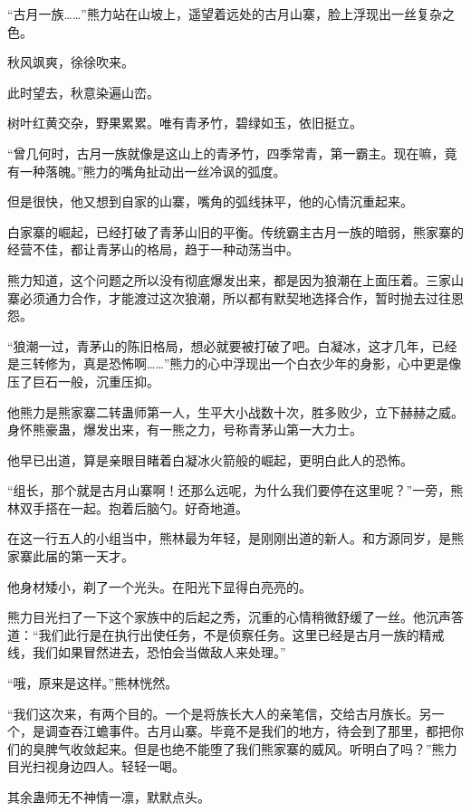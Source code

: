 
\begin{this_body}

“古月一族……”熊力站在山坡上，遥望着远处的古月山寨，脸上浮现出一丝复杂之色。

秋风飒爽，徐徐吹来。

此时望去，秋意染遍山峦。

树叶红黄交杂，野果累累。唯有青矛竹，碧绿如玉，依旧挺立。

“曾几何时，古月一族就像是这山上的青矛竹，四季常青，第一霸主。现在嘛，竟有一种落魄。”熊力的嘴角扯动出一丝冷讽的弧度。

但是很快，他又想到自家的山寨，嘴角的弧线抹平，他的心情沉重起来。

白家寨的崛起，已经打破了青茅山旧的平衡。传统霸主古月一族的暗弱，熊家寨的经营不佳，都让青茅山的格局，趋于一种动荡当中。

熊力知道，这个问题之所以没有彻底爆发出来，都是因为狼潮在上面压着。三家山寨必须通力合作，才能渡过这次狼潮，所以都有默契地选择合作，暂时抛去过往恩怨。

“狼潮一过，青茅山的陈旧格局，想必就要被打破了吧。白凝冰，这才几年，已经是三转修为，真是恐怖啊……”熊力的心中浮现出一个白衣少年的身影，心中更是像压了巨石一般，沉重压抑。

他熊力是熊家寨二转蛊师第一人，生平大小战数十次，胜多败少，立下赫赫之威。身怀熊豪蛊，爆发出来，有一熊之力，号称青茅山第一大力士。

他早已出道，算是亲眼目睹着白凝冰火箭般的崛起，更明白此人的恐怖。

“组长，那个就是古月山寨啊！还那么远呢，为什么我们要停在这里呢？”一旁，熊林双手搭在一起。抱着后脑勺。好奇地道。

在这一行五人的小组当中，熊林最为年轻，是刚刚出道的新人。和方源同岁，是熊家寨此届的第一天才。

他身材矮小，剃了一个光头。在阳光下显得白亮亮的。

熊力目光扫了一下这个家族中的后起之秀，沉重的心情稍微舒缓了一丝。他沉声答道：“我们此行是在执行出使任务，不是侦察任务。这里已经是古月一族的精戒线，我们如果冒然进去，恐怕会当做敌人来处理。”

“哦，原来是这样。”熊林恍然。

“我们这次来，有两个目的。一个是将族长大人的亲笔信，交给古月族长。另一个，是调查吞江蟾事件。古月山寨。毕竟不是我们的地方，待会到了那里，都把你们的臭脾气收敛起来。但是也绝不能堕了我们熊家寨的威风。听明白了吗？”熊力目光扫视身边四人。轻轻一喝。

其余蛊师无不神情一凛，默默点头。


\end{this_body}
